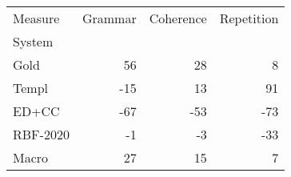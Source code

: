 \begin{tabular}{lrrr}
\toprule
Measure & Grammar & Coherence & Repetition \\
System &  &  &  \\
\midrule
Gold & 56 & 28 & 8 \\
Templ & -15 & 13 & 91 \\
ED+CC & -67 & -53 & -73 \\
RBF-2020 & -1 & -3 & -33 \\
Macro & 27 & 15 & 7 \\
\bottomrule
\end{tabular}
